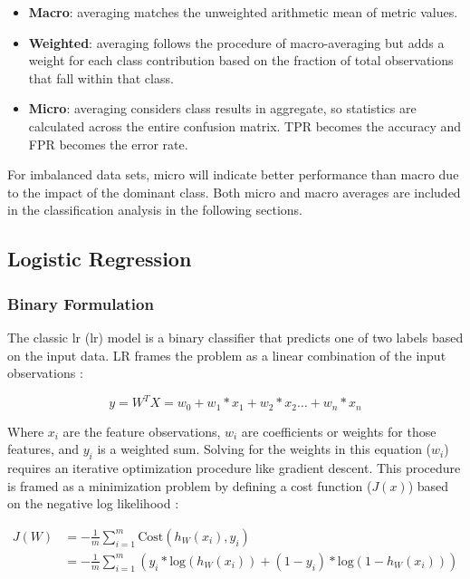 \begin{itemize}
    \item \textbf{Macro}: averaging matches the unweighted arithmetic mean of metric values.
    \item \textbf{Weighted}: averaging follows the procedure of macro-averaging but adds a weight for each class contribution based on the fraction of total observations that fall within that class. 
    \item \textbf{Micro}: averaging considers class results in aggregate, so statistics are calculated across the entire confusion matrix. TPR becomes the accuracy and FPR becomes the error rate.
\end{itemize}

For imbalanced data sets, micro will indicate better performance than macro due to the impact of the dominant class. Both micro and macro averages are included in the classification analysis in the following sections.

\subsection{Logistic Regression} \label{ch5:log_reg}

\subsubsection{Binary Formulation} 

The classic \acrlong{lr} (\acrshort{lr}) model is a binary classifier that predicts one of two labels based on the input data. LR frames the problem as a linear combination of the input observations \citep[~p 369]{bertsimas_analytics_2016}:

\begin{equation}
\label{eq:logreg_form}
    y = W^TX = w_0 + w_1 * x_1 + w_2 * x_2 \ldots + w_n * x_n 
\end{equation}

Where $x_i$ are the feature observations, $w_i$ are coefficients or weights for those features, and $y_i$ is a weighted sum. Solving for the weights in this equation ($w_i$) requires an iterative optimization procedure like gradient descent. This procedure is framed as a minimization problem by defining a cost function ($J(x)$) based on the negative log likelihood \citep{ng_logistic_2011}:

\begin{equation}
\label{eq:logreg_cost}
\begin{aligned}
        J(W) &= -\frac{1}{m} \sum_{i=1}^{m}{\text{Cost}(h_{W}(x_i),y_i)} \\ &= -\frac{1}{m}\sum_{i=1}^{m}{(y_i*\text{log}({h_{W}(x_i)})+(1-y_i)*\text{log}(1-h_{W}(x_i)))}
\end{aligned}
\end{equation}

